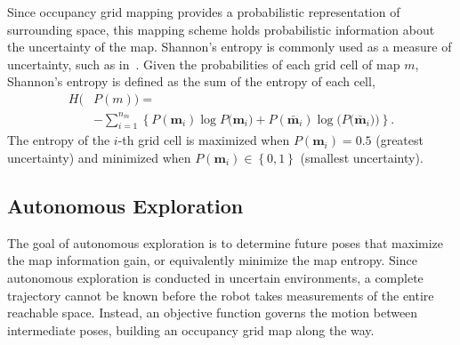 \documentclass[letterpaper, 10pt]{ieeeconf}
\newcommand{\braces}[1]{\ensuremath{\left\{ #1 \right\}}}
\begin{document}
Since occupancy grid mapping provides a probabilistic representation of surrounding space, this mapping scheme holds probabilistic information about the uncertainty of the map. Shannon's entropy is commonly used as a measure of uncertainty, such as in~\cite{CarDamKumCas15,StaGriBur05}. Given the probabilities of each grid cell of map $m$, Shannon's entropy is defined as the sum of the entropy of each cell,
\begin{align}
\label{eqn:ShannonsEntropyDef}
H(&P(m))=\nonumber\\&-\sum_{i=1}^{n_m}\braces{
P(\mathbf{m}_i)\log{P(\mathbf{m}_i})+P(\bar{\mathbf{m}}_i)\log{(P(\bar{\mathbf{m}}_i}))}.
\end{align}
The entropy of the $i$-th grid cell is maximized when $P(\mathbf{m}_i)=0.5$ (greatest uncertainty) and minimized when $P(\mathbf{m}_i)\in\braces{0,1}$ (smallest uncertainty). %


\subsection{Autonomous Exploration}

The goal of autonomous exploration is to determine future poses that maximize the map information gain, or equivalently minimize the map entropy. 
Since autonomous exploration is conducted in uncertain environments, a complete trajectory cannot be known before the robot takes measurements of the entire reachable space.
Instead, an objective function governs the motion between intermediate poses, building an occupancy grid map along the way.
\end{document}
